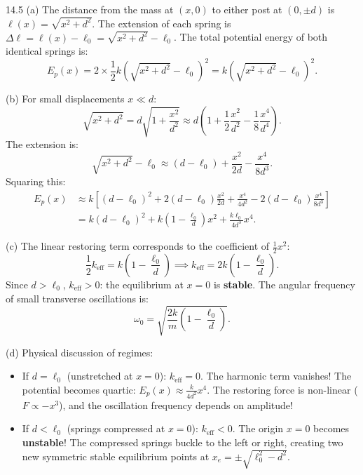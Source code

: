 \begin{solution}{14.5}
(a) The distance from the mass at $(x, 0)$ to either post at $(0, \pm d)$ is $\ell(x) = \sqrt{x^2 + d^2}$.
The extension of each spring is $\Delta\ell = \ell(x) - \ell_0 = \sqrt{x^2 + d^2} - \ell_0$.
The total potential energy of both identical springs is:
\[
\boxed{E_p(x) = 2\times\frac{1}{2}k\left( \sqrt{x^2 + d^2} - \ell_0 \right)^2 = k\left( \sqrt{x^2 + d^2} - \ell_0 \right)^2.}
\]

(b) For small displacements $x \ll d$:
\[
\sqrt{x^2 + d^2} = d\sqrt{1 + \frac{x^2}{d^2}} \approx d\left( 1 + \frac{1}{2}\frac{x^2}{d^2} - \frac{1}{8}\frac{x^4}{d^4} \right).
\]
The extension is:
\[
\sqrt{x^2 + d^2} - \ell_0 \approx (d - \ell_0) + \frac{x^2}{2d} - \frac{x^4}{8d^3}.
\]
Squaring this:
\begin{align*}
E_p(x) &\approx k\left[ (d - \ell_0)^2 + 2(d - \ell_0)\frac{x^2}{2d} + \frac{x^4}{4d^2} - 2(d - \ell_0)\frac{x^4}{8d^3} \right] \\
&= k(d - \ell_0)^2 + k\left(1 - \frac{\ell_0}{d}\right)x^2 + \frac{k\ell_0}{4d^3}x^4.
\end{align*}

(c) The linear restoring term corresponds to the coefficient of $\frac{1}{2}x^2$:
\[
\frac{1}{2}k_{\text{eff}} = k\left(1 - \frac{\ell_0}{d}\right) \implies \boxed{k_{\text{eff}} = 2k\left(1 - \frac{\ell_0}{d}\right).}
\]
Since $d > \ell_0$, $k_{\text{eff}} > 0$: the equilibrium at $x = 0$ is \textbf{stable}.
The angular frequency of small transverse oscillations is:
\[
\boxed{\omega_0 = \sqrt{\frac{2k}{m}\left(1 - \frac{\ell_0}{d}\right)}.}
\]

(d) Physical discussion of regimes:
\begin{itemize}[leftmargin=1.4em,itemsep=2pt]
  \item If $d = \ell_0$ (unstretched at $x=0$): $k_{\text{eff}} = 0$. The harmonic term vanishes! The potential becomes quartic: $E_p(x) \approx \frac{k}{4d^2}x^4$. The restoring force is non-linear ($F \propto -x^3$), and the oscillation frequency depends on amplitude!
  \item If $d < \ell_0$ (springs compressed at $x=0$): $k_{\text{eff}} < 0$. The origin $x = 0$ becomes \textbf{unstable}! The compressed springs buckle to the left or right, creating two new symmetric stable equilibrium points at $x_e = \pm\sqrt{\ell_0^2 - d^2}$.
\end{itemize}
\end{solution}
